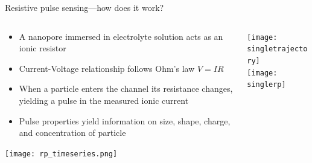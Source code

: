 \begin{frame}[c]{Resistive pulse sensing---how does it work?}

	\begin{columns}[t]
		\begin{column}[T]{2.75in}
	      
	

			\begin{tiny}
				\begin{itemize}
				
					\item A nanopore immersed in electrolyte solution acts as an ionic resistor
					\item Current-Voltage relationship follows Ohm's law $V=IR$
					\item When a particle enters the channel its resistance changes, yielding a pulse in the measured ionic current
					\item Pulse properties yield information on size, shape, charge, and concentration of particle
				\end{itemize}
				{\centering
					\texttt{[image: rp\_timeseries.png]} \\ \par
				}
			\end{tiny}
			
		\end{column}
		
		\begin{column}[T]{1.75in}
			{\centering
				\vspace{.5cm}
				\texttt{[image: singletrajectory]} \\
				\vspace{.75cm}
				\texttt{[image: singlerp]} \\
				\par
			}
			
		\end{column}

	
	
	\end{columns}
	
\end{frame}






